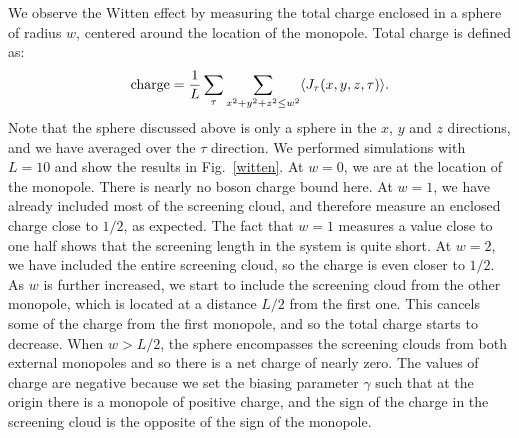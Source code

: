 \documentclass[prb,twocolumn]{revtex4-1}
\newcommand{\scripty}[1]{w}
\begin{document}
We observe the Witten effect by measuring the total charge enclosed in a sphere of radius $\scripty{r}$, centered around the location of the monopole. Total charge is defined as:
\begin{equation}
{\rm charge}=\frac{1}{L}\sum_\tau \sum_{x^2+y^2+z^2\leq w^2} \langle J_\tau(x,y,z,\tau) \rangle.
\end{equation}
Note that the sphere discussed above is only a sphere in the $x$, $y$ and $z$ directions, and we have averaged over the $\tau$ direction.
We performed simulations with $L=10$ and show the results in Fig.~\ref{witten}.
At $\scripty{r}=0$, we are at the location of the monopole. There is nearly no boson charge bound here. At $\scripty{r}=1$, we have already included most of the screening cloud, and therefore measure an enclosed charge close to $1/2$, as expected. The fact that $\scripty{r}=1$ measures a value close to one half shows that the screening length in the system is quite short. At $\scripty{r}=2$, we have included the entire screening cloud, so the charge is even closer to $1/2$. As $\scripty{r}$ is further increased, we start to include the screening cloud from the other monopole, which is located at a distance $L/2$ from the first one. This cancels some of the charge from the first monopole, and so the total charge starts to decrease. When $\scripty{r}>L/2$, the sphere encompasses the screening clouds from both external monopoles and so there is a net charge of nearly zero. The values of charge are negative because we set the biasing parameter $\gamma$ such that at the origin there is a monopole of positive charge, and the sign of the charge in the screening cloud is the opposite of the sign of the monopole. 
\end{document}
